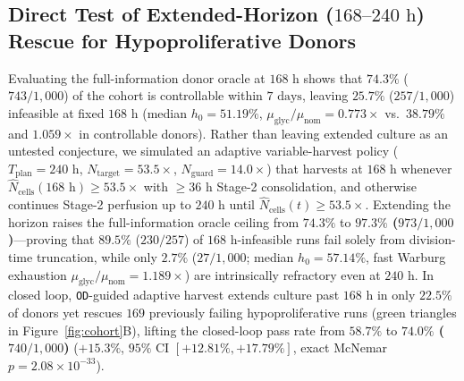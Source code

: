 \documentclass[11pt]{article}
\theoremstyle{plain}
\theoremstyle{remark}
\begin{document}
\subsection{Direct Test of Extended-Horizon ($168\text{--}240\text{ h}$) Rescue for Hypoproliferative Donors}
Evaluating the full-information donor oracle at $168\text{ h}$ shows that $74.3\%$ ($743/1{,}000$) of the cohort is controllable within $7\text{ days}$, leaving $25.7\%$ ($257/1{,}000$) infeasible at fixed $168\text{ h}$ (median $h_0 = 51.19\%$, $\mu_{\mathrm{glyc}}/\mu_{\mathrm{nom}} = 0.773\times$ vs.\ $38.79\%$ and $1.059\times$ in controllable donors). Rather than leaving extended culture as an untested conjecture, we simulated an adaptive variable-harvest policy ($T_{\mathrm{plan}} = 240\text{ h}$, $N_{\mathrm{target}} = 53.5\times$, $N_{\mathrm{guard}} = 14.0\times$) that harvests at $168\text{ h}$ whenever $\hat{N}_{\mathrm{cells}}(168\text{ h}) \ge 53.5\times$ with $\ge 36\text{ h}$ Stage-2 consolidation, and otherwise continues Stage-2 perfusion up to $240\text{ h}$ until $\hat{N}_{\mathrm{cells}}(t) \ge 53.5\times$. Extending the horizon raises the full-information oracle ceiling from $74.3\%$ to \textbf{$97.3\%$ ($973/1{,}000$)}---proving that $89.5\%$ ($230/257$) of $168\text{ h}$-infeasible runs fail solely from division-time truncation, while only $2.7\%$ ($27/1{,}000$; median $h_0 = 57.14\%$, fast Warburg exhaustion $\mu_{\mathrm{glyc}}/\mu_{\mathrm{nom}} = 1.189\times$) are intrinsically refractory even at $240\text{ h}$. In closed loop, \texttt{OD}-guided adaptive harvest extends culture past $168\text{ h}$ in only $22.5\%$ of donors yet rescues $169$ previously failing hypoproliferative runs (green triangles in Figure~\ref{fig:cohort}B), lifting the closed-loop pass rate from $58.7\%$ to \textbf{$74.0\%$ ($740/1{,}000$)} ($+15.3\%$, $95\%$ CI $[+12.81\%, +17.79\%]$, exact McNemar $p = 2.08 \times 10^{-33}$).
\end{document}

